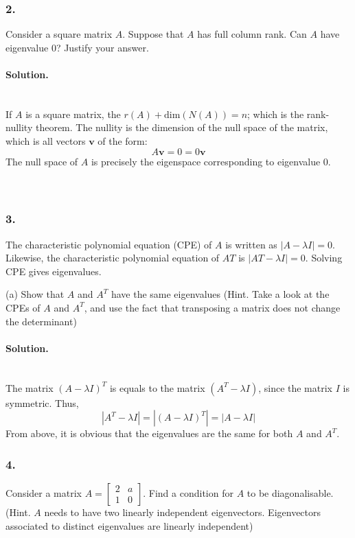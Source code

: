 \subsubsection{2.} Consider a square matrix $A$. Suppose that $A$ has full column rank. Can $A$ have eigenvalue $0$? Justify your answer.
\paragraph{Solution.}\phantom{}\\
If $A$ is a square matrix, the $r(A) + \mathrm{dim}(N(A)) = n$; which is the rank-nullity theorem.
The nullity is the dimension of the null space of the matrix, which is all vectors $\mathbf{v}$ of the form:
$$A\mathbf{v} = 0 = 0\mathbf{v}$$
The null space of $A$ is precisely the eigenspace corresponding to eigenvalue $0$.
\\\\\\
\subsubsection{3.} The characteristic polynomial equation (CPE) of $A$ is written as $|A - \lambda I| = 0$. Likewise, the characteristic polynomial equation of $AT$ is $|AT - \lambda I| = 0$. Solving CPE gives eigenvalues.

(a) Show that $A$ and $A^T$ have the same eigenvalues (Hint. Take a look at the CPEs of $A$ and $A^T$, and use the fact that transposing a matrix does not change the determinant)
\paragraph{Solution.}\phantom{}\\
The matrix $(A-\lambda I)^T$ is equals to the matrix $(A^T-\lambda I)$, since the matrix $I$ is symmetric.
Thus, $$|A^T - \lambda I| = |(A - \lambda I)^T| = |A-\lambda I|$$
From above, it is obvious that the eigenvalues are the same for both $A$ and $A^T$.
\newpage
\subsubsection{4.}
Consider a matrix $A = \begin{bmatrix}2&a\\1&0\end{bmatrix}$. Find a condition for $A$ to be diagonalisable.
(Hint. $A$ needs to have two linearly independent eigenvectors. Eigenvectors associated to distinct eigenvalues are linearly independent)
